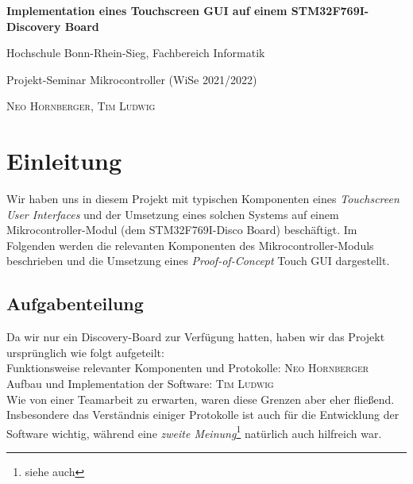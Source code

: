 \documentclass[a4paper,singleside,12pt,titlepage]{scrartcl}
\begin{document}
	    \begin{titlepage}
		
		\hspace*{0pt}
		\vfill
		\begin{center}
			{\Huge\textbf{Implementation eines Touchscreen GUI auf einem STM32F769I-Discovery Board}}\par
			\bigskip
			\bigskip
			{\large Hochschule Bonn-Rhein-Sieg, Fachbereich Informatik}\par
			{\large Projekt-Seminar Mikrocontroller (WiSe 2021/2022)}\par
			\bigskip
			\bigskip
			\bigskip
			\bigskip
			\bigskip
			\textsc{Neo Hornberger, Tim Ludwig}\par
		\end{center}
		\vfill
		\hspace*{0pt}
	\end{titlepage}

	\tableofcontents
	\listoffigures
	\newpage
	
	\section{Einleitung}
		Wir haben uns in diesem Projekt mit typischen Komponenten eines \emph{Touchscreen User Interfaces}
		und der Umsetzung eines solchen Systems auf einem Mikrocontroller-Modul (dem STM32F769I-Disco Board) beschäftigt.
		Im Folgenden werden die relevanten Komponenten des Mikrocontroller-Moduls beschrieben
		und die Umsetzung eines \emph{Proof-of-Concept} Touch GUI dargestellt.
		
		\subsection{Aufgabenteilung}
			Da wir nur ein Discovery-Board zur Verfügung hatten, haben wir das Projekt ursprünglich wie folgt aufgeteilt:\\
			Funktionsweise relevanter Komponenten und Protokolle: \textsc{Neo Hornberger}\\
			Aufbau und Implementation der Software: \textsc{Tim Ludwig}\\
			Wie von einer Teamarbeit zu erwarten, waren diese Grenzen aber eher fließend.
			Insbesondere das Verständnis einiger Protokolle ist auch für die Entwicklung der Software wichtig,
			während eine \emph{zweite Meinung}\footnote{siehe auch }
			natürlich auch hilfreich war.
	
\end{document}
